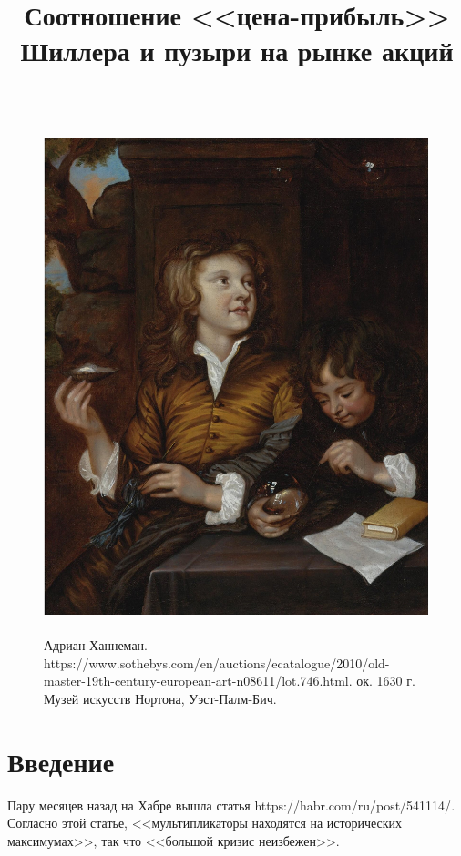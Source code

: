 

\title{Соотношение <<цена-прибыль>> Шиллера и пузыри на рынке акций}

\usepackage[font=small]{caption}



\maketitle
\thispagestyle{empty}

\begin{figure}[h]
\centering
\includegraphics[height=14.9cm]{img/two_boys_blowing_bubbles.jpg}
\captionsetup{labelformat=empty}
\caption{\small{
    Адриан Ханнеман.
    {https://www.sothebys.com/en/auctions/ecatalogue/2010/old-master-19th-century-european-art-n08611/lot.746.html}.
    ок. 1630 г. Музей искусств Нортона, Уэст-Палм-Бич.
}}
\end{figure}
\setcounter{figure}{0}
\newpage

\section*{Введение}
Пару месяцев назад на Хабре вышла статья
{https://habr.com/ru/post/541114/}. Согласно этой статье, <<мультипликаторы 
находятся на исторических максимумах>>, так что <<большой кризис неизбежен>>.

